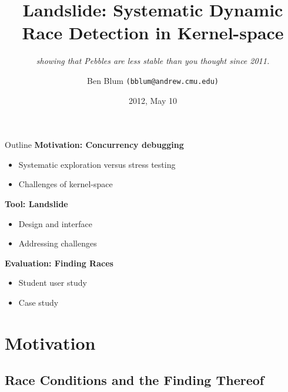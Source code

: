\documentclass[xcolor=dvipsnames]{beamer}
\title[Landslide]{{\bf Landslide: Systematic Dynamic Race Detection in Kernel-space}}
\subtitle[]{ {\em showing that Pebbles are less stable than you thought since 2011.}}
\author[Ben Blum]{Ben Blum \texttt{(bblum@andrew.cmu.edu)}}
\institute[CMU]{Carnegie Mellon University}
\date[]{2012, May 10}
\begin{document}
\normalem
\begin{frame}
	\titlepage
\end{frame}


\newcommand\linegap{\vspace{0.2in}}
\newcommand\breakslide[1]{\begin{frame}{} \begin{center} #1 \end{center} \end{frame}}
\newcommand\related[1]{\textsuperscript{\em #1}}

\begin{frame}{Outline}
	\textbf{Motivation: Concurrency debugging}
	\begin{itemize}
		\item Systematic exploration versus stress testing
		\item Challenges of kernel-space
	\end{itemize}
	\linegap

	{\bf Tool: Landslide}
	\begin{itemize}
		\item Design and interface 
		\item Addressing challenges
	\end{itemize}
	\linegap

	{\bf Evaluation: Finding Races}
	\begin{itemize}
		\item Student user study
		\item Case study
	\end{itemize}
\end{frame}

\section{Motivation}

\subsection{Race Conditions and the Finding Thereof}
\end{document}

